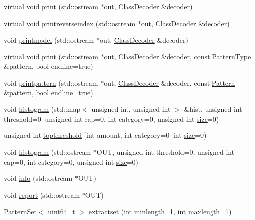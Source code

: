 \begin{DoxyCompactItemize}
\item 
virtual void \hyperlink{classPatternModel_aba01edce114df253215e905e63acbee1}{print} (std\+::ostream $\ast$out, \hyperlink{classClassDecoder}{Class\+Decoder} \&decoder)
\item 
virtual void \hyperlink{classPatternModel_a0be389d2ec90c3d1ab368f915aa878f2}{printreverseindex} (std\+::ostream $\ast$out, \hyperlink{classClassDecoder}{Class\+Decoder} \&decoder)
\item 
void \hyperlink{classPatternModel_a251e7848e11e320ab6ccf249d910cfd5}{printmodel} (std\+::ostream $\ast$out, \hyperlink{classClassDecoder}{Class\+Decoder} \&decoder)
\item 
virtual void \hyperlink{classPatternModel_ae2c135f4a441d6b80c50e89699419e1c}{print} (std\+::ostream $\ast$out, \hyperlink{classClassDecoder}{Class\+Decoder} \&decoder, const \hyperlink{pattern_8h_a351dc5aa88481a949638aeb6cc5e6754}{Pattern\+Type} \&pattern, bool endline=true)
\item 
void \hyperlink{classPatternModel_a4b001eb3f0c864155cd35c92bbb451fb}{printpattern} (std\+::ostream $\ast$out, \hyperlink{classClassDecoder}{Class\+Decoder} \&decoder, const \hyperlink{classPattern}{Pattern} \&pattern, bool endline=true)
\item 
void \hyperlink{classPatternModel_a52421768bdfaf6041b9b9aac3007431b}{histogram} (std\+::map$<$ unsigned int, unsigned int $>$ \&hist, unsigned int threshold=0, unsigned int cap=0, int category=0, unsigned int \hyperlink{classPatternModel_a2422cb944da209f399b3b10f3b1d2684}{size}=0)
\item 
unsigned int \hyperlink{classPatternModel_ad2e98cec42e61474b46c0799d4da951e}{topthreshold} (int amount, int category=0, int \hyperlink{classPatternModel_a2422cb944da209f399b3b10f3b1d2684}{size}=0)
\item 
void \hyperlink{classPatternModel_a89cea4fdb95cf5f1e9a363c76300062e}{histogram} (std\+::ostream $\ast$O\+U\+T, unsigned int threshold=0, unsigned int cap=0, int category=0, unsigned int \hyperlink{classPatternModel_a2422cb944da209f399b3b10f3b1d2684}{size}=0)
\item 
void \hyperlink{classPatternModel_a6f4cc32e18eceda5029f215ab67f06e4}{info} (std\+::ostream $\ast$O\+U\+T)
\item 
void \hyperlink{classPatternModel_a83ea8018b62f30b57f0626e5bf7d5a24}{report} (std\+::ostream $\ast$O\+U\+T)
\item 
\hyperlink{classPatternSet}{Pattern\+Set}$<$ uint64\+\_\+t $>$ \hyperlink{classPatternModel_a95c603b1ed42603a2dcb22f25d3c2c50}{extractset} (int \hyperlink{classPatternModel_a7a0208745487928ecb418baeb78e810f}{minlength}=1, int \hyperlink{classPatternModel_a545fbfefef4eadb268217ec781c494bb}{maxlength}=1)

\end{DoxyCompactItemize}
